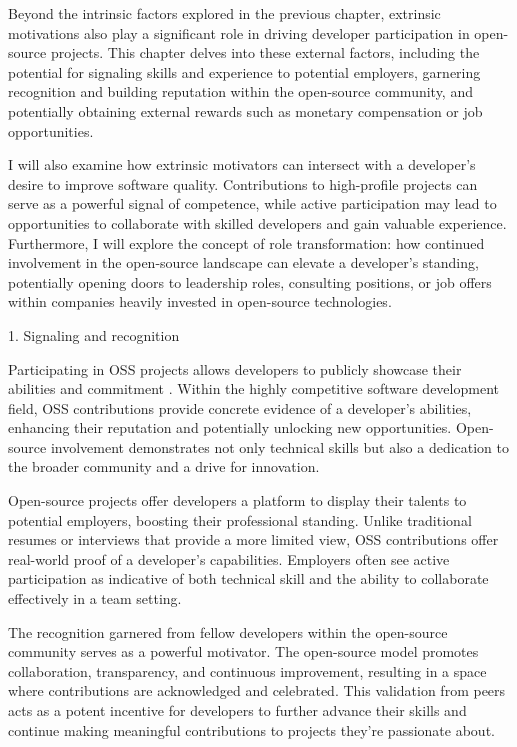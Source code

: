 Beyond the intrinsic factors explored in the previous chapter, extrinsic motivations also play a significant role in driving developer participation in open-source projects. This chapter delves into these external factors, including the potential for signaling skills and experience to potential employers, garnering recognition and building reputation within the open-source community, and potentially obtaining external rewards such as monetary compensation or job opportunities.

I will also examine how extrinsic motivators can intersect with a developer's  desire to improve software quality. Contributions to high-profile projects can serve as a powerful signal of competence, while active participation may lead to opportunities to collaborate with skilled developers and gain valuable experience.  Furthermore, I will explore the concept of role transformation: how continued involvement in the open-source landscape can elevate a developer's standing, potentially opening doors to leadership roles, consulting positions, or  job offers within companies heavily invested in open-source technologies.

1. Signaling and recognition

Participating in OSS projects allows developers to publicly showcase their abilities and commitment \cite{05bitzer2007intrinsic,06ye2003toward,07zhao2024openrank,08zhang2024paid,09lakhani2005hackers,10wu2007empirical,11gerosa2021shifting,12choi2015characteristics,13li2012leadership,15roberts2006understanding,17alexander2002working,18oreg2008exploring}. Within the highly competitive software development field, OSS contributions provide concrete evidence of a developer's abilities, enhancing their reputation and potentially unlocking new opportunities.  Open-source involvement demonstrates not only technical skills but also a dedication to the broader community and a drive for innovation.


Open-source projects offer developers a platform to display their talents to potential employers, boosting their professional standing. Unlike traditional resumes or interviews that provide a more limited view, OSS contributions offer real-world proof of a developer's capabilities. Employers often see active participation as indicative of both technical skill and the ability to collaborate effectively in a team setting.

The recognition garnered from fellow developers within the open-source community serves as a powerful motivator. The open-source model promotes collaboration, transparency, and continuous improvement, resulting in a space where contributions are acknowledged and celebrated. This validation from peers acts as a potent incentive for developers to further advance their skills and continue making meaningful contributions to projects they're passionate about.


